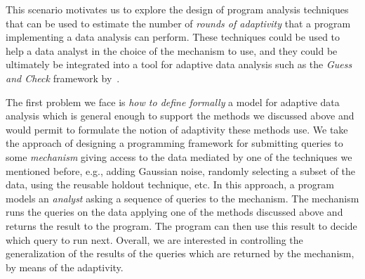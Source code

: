 This scenario motivates us to explore the design of program analysis techniques that can be used to estimate the number of \emph{rounds of adaptivity} that a program implementing a data analysis can perform. These techniques could be used to help a data analyst in the choice of the mechanism to use,
and they
could be ultimately be integrated into a tool for adaptive data analysis such as the \emph{Guess and Check} framework by~\citet{RogersRSSTW20}. 
%

The first problem we face is \emph{how to define formally} a model for adaptive data analysis which is general enough to support the methods we discussed above and would permit to formulate the notion of adaptivity these methods use. 
We take the approach of designing a programming framework for submitting queries to some \emph{mechanism} giving access to the data mediated by one of the techniques we mentioned before, e.g., adding Gaussian noise, randomly selecting a subset of the data, using the reusable holdout technique, etc. 
In this approach, a program models an \emph{analyst} asking a sequence of queries to the mechanism. The mechanism runs the queries on the data applying one of the methods discussed above and returns the result to the program. The program can then use this result to decide which query to run next. 
Overall, we are interested in controlling the generalization of the results of the queries which are returned by the mechanism, by means of the adaptivity. 

